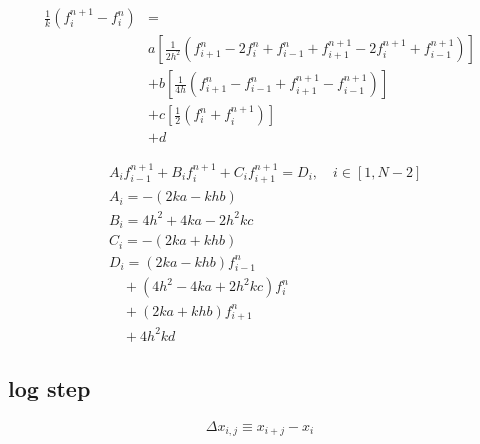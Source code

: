 \documentclass{article}
\begin{document}
    \begin{equation}
        \begin{split}
            \frac{1}{k}\left(f_i^{n+1} - f_i^n\right) &=
            \\
            & a \left[
                \frac{1}{2h^2} \left( f_{i+1}^n - 2f_i^{n} + f_{i-1}^n
                     + f_{i+1}^{n+1} - 2f_i^{n+1} +f_{i-1}^{n+1} \right)
                     \right]
            \\
            & + b \left[ 
            \frac{1}{4h}
                \left( f_{i+1}^n - f_{i-1}^n + f_{i+1}^{n+1} - f_{i-1}^{n+1} \right)
                     \right]
            \\
            & + c \left[ 
                \frac{1}{2} \left( f_i^n + f_i^{n+1} \right)
                     \right]
            \\
            & + d
        \end{split}
    \end{equation}

    \begin{equation}
        \begin{split}
            &A_i f_{i-1}^{n+1} + B_i f_i^{n+1} + C_i f_{i+1}^{n+1} = D_i, \quad i \in [1, N-2]
            \\
            &A_i = -(2ka - khb)
            \\
            &B_i = 4h^2 + 4ka - 2h^2kc
            \\
            &C_i = -( 2ka + khb )
            \\
            &D_i = (2ka - khb) f_{i-1}^{n}
            \\
            &\quad + (4h^2 - 4ka + 2h^2kc) f_i^n 
            \\
            &\quad + (2ka + khb) f_{i+1}^{n}
            \\
            &\quad + 4h^2kd
        \end{split}
    \end{equation}

\subsection{log step}

    \begin{equation}
        \Delta x_{i,j} \equiv x_{i+j} - x_i
    \end{equation}
\end{document}
